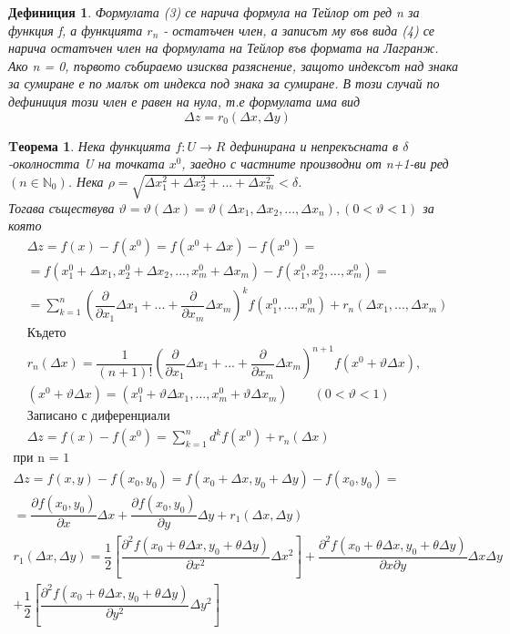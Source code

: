 \documentclass[a4paper,fleqn,12pt]{article}
\newtheorem{theorem}{Tеорема}[subsection]
\newtheorem{definition}{Дефиниция}[subsection]
\theoremstyle{definition}
\begin{document}
\begin{definition}
Формулата (3) се нарича формула на Тейлор от ред n за функция f, а функцията $r_n$ - остатъчен член, а записът му във вида (4) се нарича остатъчен член на формулата на Тейлор във формата на Лагранж. \\
Ако n = 0, първото събираемо изисква разяснение, защото индексът над знака за сумиране е по малък от индекса под знака за сумиране. В този случай  по дефиниция този член е равен на нула, т.е формулата има вид
$$\Delta z = r_0 (\Delta x, \Delta y)$$
\end{definition}

\begin{theorem}
Нека функцията $f: U \to R$ дефинирана и непрекъсната в $\delta$-околността U на точката $x^0$, заедно с частните производни от n+1-ви ред $(n \in \mathbb{N}_0)$. Нека $\rho = \sqrt{\Delta x_1 ^2 + \Delta x_2 ^2 + ... + \Delta x_m ^2} < \delta$. \\
Тогава съществува $\vartheta = \vartheta(\Delta x) = \vartheta(\Delta x_1, \Delta x_2, ..., \Delta x_n) ,  (0 < \vartheta < 1)$ за която
\begin{gather*}
\Delta z = f(x) - f(x^0) = f(x^0 + \Delta x) - f(x^0) =\\
= f(x_1^0 + \Delta x_1, x_2^0 + \Delta x_2,...,x_m^0 + \Delta x_m) - f(x_1^0, x_2^0, ..., x_m ^0) = \\
=\sum_{k=1} ^ n \left( \dfrac{\partial}{\partial x_1} \Delta x_1 + ... + \dfrac{\partial}{\partial x_m} \Delta x_m\right)^k f(x_1^0,..., x_m^0) + r_n(\Delta x_1, ... , \Delta x_m)\\
\text{Където}\\
r_n(\Delta x) = \dfrac{1}{(n+1)!} \left(\dfrac{\partial}{\partial x_1} \Delta x_1 + ... + \dfrac{\partial}{\partial x_m} \Delta x_m  \right)^{n+1} f(x^0 + \vartheta \Delta x),\\
(x^0 + \vartheta \Delta x) = (x_1^0 + \vartheta\Delta x_1 , ... ,x_m^0 + \vartheta\Delta x_m) \qquad (0 < \vartheta < 1) \\
\text{Записано с диференциали}\\
\Delta z = f(x) - f(x^0) = \sum_{k=1} ^n d^k f(x^0) + r_n(\Delta x)
\end{gather*}
\begin{gather*}
\text{при n = 1}\\
\Delta z = f(x,y) - f(x_0, y_0) = f(x_0 + \Delta x, y_0 + \Delta y) - f(x_0, y_0) = \\
= \dfrac{\partial f(x_0, y_0) }{\partial x} \Delta x + \dfrac{\partial f(x_0, y_0) }{\partial y} \Delta y + r_1(\Delta x,\Delta y)\\
r_1(\Delta x,\Delta y) = \dfrac{1}{2} \left[ \dfrac{\partial^2 f(x_0 + \theta \Delta x, y_0 + \theta \Delta y)}{\partial x^2} \Delta x^2 \right] + \dfrac{\partial^2 f(x_0 + \theta \Delta x, y_0 + \theta \Delta y)}{\partial x \partial y } \Delta x \Delta y \\
 +\dfrac{1}{2} \left[ \dfrac{\partial^2 f(x_0 + \theta \Delta x, y_0 + \theta \Delta y)}{\partial y^2} \Delta y^2 \right]
\end{gather*}
\end{theorem}
\end{document}
